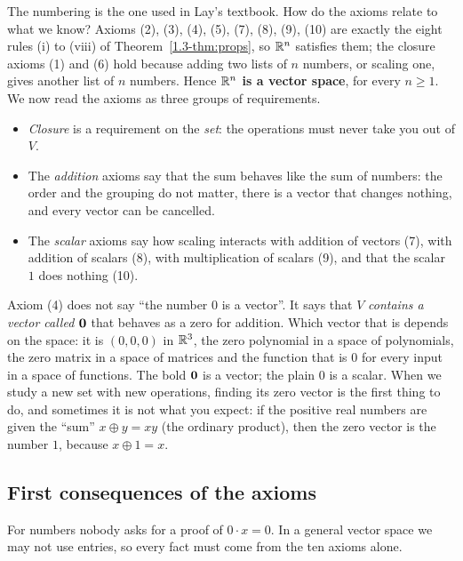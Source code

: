 \documentclass[11pt]{article}
\begin{document}
The numbering is the one used in Lay's textbook. How do the axioms relate to what we know? Axioms (2), (3), (4), (5), (7), (8), (9), (10) are exactly the eight rules (i) to (viii) of Theorem~\ref{1.3-thm:props}, so $\mathbb{R}^n$ satisfies them; the closure axioms (1) and (6) hold because adding two lists of $n$ numbers, or scaling one, gives another list of $n$ numbers. Hence \textbf{$\mathbb{R}^n$ is a vector space}, for every $n\geq1$. We now read the axioms as three groups of requirements.
\begin{itemize}
  \item \emph{Closure} is a requirement on the \emph{set}: the operations must never take you out of $V$.
  \item The \emph{addition} axioms say that the sum behaves like the sum of numbers: the order and the grouping do not matter, there is a vector that changes nothing, and every vector can be cancelled.
  \item The \emph{scalar} axioms say how scaling interacts with addition of vectors (7), with addition of scalars (8), with multiplication of scalars (9), and that the scalar $1$ does nothing (10).
\end{itemize}

\begin{remark}
Axiom (4) does not say ``the number $0$ is a vector''. It says that $V$ \emph{contains a vector called $\mathbf{0}$} that behaves as a zero for addition. Which vector that is depends on the space: it is $(0,0,0)$ in $\mathbb{R}^3$, the zero polynomial in a space of polynomials, the zero matrix in a space of matrices and the function that is $0$ for every input in a space of functions. The bold $\mathbf{0}$ is a vector; the plain $0$ is a scalar. When we study a new set with new operations, finding its zero vector is the first thing to do, and sometimes it is not what you expect: if the positive real numbers are given the ``sum'' $x\oplus y=xy$ (the ordinary product), then the zero vector is the number $1$, because $x\oplus1=x$.
\end{remark}

\subsection*{First consequences of the axioms}

For numbers nobody asks for a proof of $0\cdot x=0$. In a general vector space we may not use entries, so every fact must come from the ten axioms alone.
\end{document}
